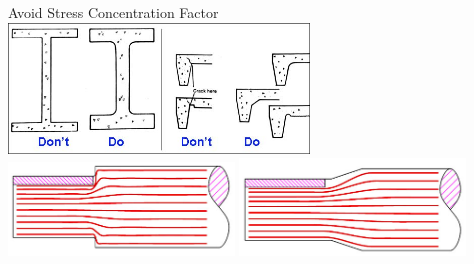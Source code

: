\documentclass[10pt, svgnames]{beamer}
\begin{document}
\begin{frame}[label={sec:org2cafb2e}]{Avoid Stress Concentration Factor}
\centering
\includegraphics[width=0.6\textwidth]{pictures/avoid-sharp-corners} \\\empty
\vspace{0.3cm}
\includegraphics[width=0.45\textwidth]{pictures/avoid-sharp-shoulder}
\includegraphics[width=0.45\textwidth]{pictures/avoid-sharp-shoulder2}
\end{frame}
\end{document}
